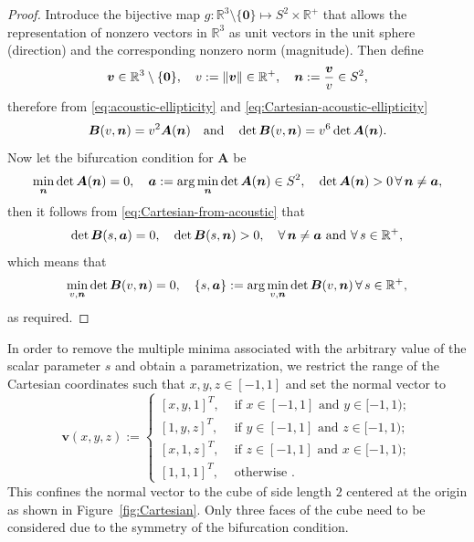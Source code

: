\documentclass[12pt]{article}
\newcommand{\mbs}[1]{\boldsymbol{#1}}
\newcommand{\mbb}[1]{\mathbb{#1}}
\def\bA{{\mbs{A}}} \def\bB{{\mbs{B}}} \def\bC{{\mbs{C}}}
\def\ba{{\mbs{a}}} \def\bb{{\mbs{b}}} \def\bc{{\mbs{c}}}
\def\bv{{\mbs{v}}} \def\bw{{\mbs{w}}} \def\bx{{\mbs{x}}}
\numberwithin{equation}{section}
\begin{document}
\begin{proof}
  Introduce the bijective map $g : \mbb{R}^3 \setminus \{\mathbf{0}\}
  \mapsto S^2 \times \mbb{R}^+$ that allows the representation of
  nonzero vectors in $\mbb{R}^3$ as unit vectors in the unit sphere
  (direction) and the corresponding nonzero norm (magnitude). Then
  define
  \begin{equation}
    \bv \in \mbb{R}^3 \setminus \{\mathbf{0}\},
    \quad
    v := \| \bv \| \in \mbb{R}^+,
    \quad
    \bn := \frac{\bv}{v} \in S^2,
  \end{equation}
  therefore from \eqref{eq:acoustic-ellipticity} and
  \eqref{eq:Cartesian-acoustic-ellipticity}
  \begin{equation} \label{eq:Cartesian-from-acoustic}
      \bB(v, \bn)
      =
      v^2 \bA(\bn)
      \quad \text{and} \quad
      \det \bB(v, \bn) = v^6 \det \bA(\bn).
  \end{equation}
  Now let the bifurcation condition for $\bA$ be
  \begin{equation}
    \min_{\bn} \det \bA(\bn) = 0,
    \quad
    \ba := \arg \min_{\bn} \det \bA(\bn) \in S^2,
    \quad
    \det \bA(\bn) > 0 \, \forall \, \bn \neq \ba,
  \end{equation}
  then it follows from \eqref{eq:Cartesian-from-acoustic} that
  \begin{equation}
    \det \bB(s, \ba) = 0,
    \quad
    \det \bB(s, \bn) > 0,
    \quad \forall \, \bn \neq \ba
    \text{ and } \forall \, s \in \mbb{R}^+,
  \end{equation}
  which means that
  \begin{equation}
    \min_{v, \bn} \det \bB(v, \bn) = 0,
    \quad
    \{s, \ba\} := \arg \min_{v, \bn} \det \bB(v, \bn)
    \,
    \forall \, s \in \mbb{R}^+,
  \end{equation}
  as required.
\end{proof}

In order to remove the multiple minima associated with the arbitrary
value of the scalar parameter $s$ and obtain a parametrization, we
restrict the range of the Cartesian coordinates such that $x,y,z \in
[-1,1]$ and set the normal vector to
\begin{equation}
  \bv(x,y,z)
  :=
  \begin{cases}
    [x,y,1]^T,
    &
    \text{ if }x \in [-1,1] \text{ and } y \in [-1,1);
    \\
    [1,y,z]^T,
    &
    \text{ if }y \in [-1,1] \text{ and } z \in [-1,1);
    \\
    [x,1,z]^T,
    &
    \text{ if }z \in [-1,1] \text{ and } x \in [-1,1);
    \\
    [1,1,1]^T,
    &
    \text{ otherwise }.
  \end{cases}
\end{equation}
This confines the normal vector to the cube of side length $2$
centered at the origin as shown in Figure~\ref{fig:Cartesian}. Only
three faces of the cube need to be considered due to the symmetry of
the bifurcation condition.
\end{document}

